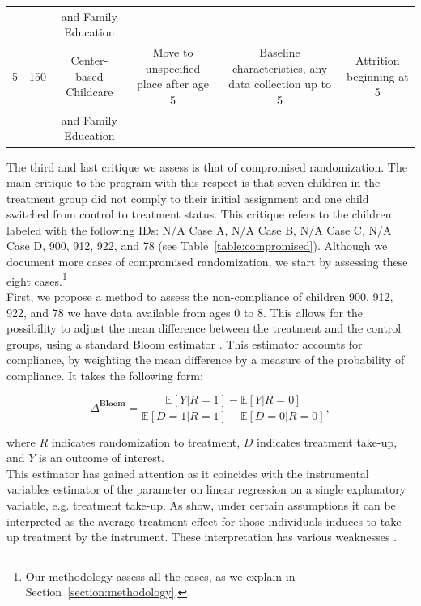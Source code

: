 \begin{table}
\begin{threeparttable}
\begin{tabular}{cccccc}
 &  & and Family Education &  &  & \\
5 & 150 & Center-based Childcare & Move to unspecified place after age 5 & Baseline characteristics, any data collection up to 5 & Attrition beginning at 5 \\
 &  & and Family Education &  &  & \\ \hline \hline 
\end{tabular}
\end{threeparttable}
\end{table}

\restoregeometry

\noindent The third and last critique we assess is that of compromised randomization. The main critique to the program with this respect is that seven children in the treatment group did not comply to their initial assignment and one child switched from control to treatment status. This critique refers to the children labeled with the following IDs: N/A Case A, N/A Case B, N/A Case C, N/A Case D, 900, 912, 922, and 78 (see Table~\ref{table:compromised}). Although we document more cases of compromised randomization, we start by assessing these eight cases.\footnote{Our methodology assess all the cases, as we explain in Section~\ref{section:methodology}.}\\

\noindent First, we propose a method to assess the non-compliance of children 900, 912, 922, and 78 we have data available from ages 0 to 8. This allows for the possibility to adjust the mean difference between the treatment and the control groups, using a standard Bloom estimator \citep{Bloom_1984_ER}. This estimator accounts for compliance, by weighting the mean difference by a measure of the probability of compliance. It takes the following form: 

\begin{equation}
\Delta^{\textbf{Bloom}} = \frac{\mathbb{E} \left[ Y | R = 1 \right] - \mathbb{E} \left[ Y | R = 0 \right] }{\mathbb{E} \left[ D = 1 | R = 1 \right] - \mathbb{E} \left[ D = 0 | R = 0 \right]}, 
\end{equation}

\noindent where $R$ indicates randomization to treatment, $D$ indicates treatment take-up, and $Y$ is an outcome of interest.\\

\noindent This estimator has gained attention as it coincides with the instrumental variables estimator of the parameter on linear regression on a single explanatory variable, e.g. treatment take-up. As \citet{Angrist_Imbens_ea_1996_JASA} show, under certain assumptions it can be interpreted as the average treatment effect for those individuals induces to take up treatment by the instrument. These interpretation has various weaknesses \citep{Heckman_Urzua_2010_JoE,Heckman_Urzua_etal_2006_REStat}.\\

